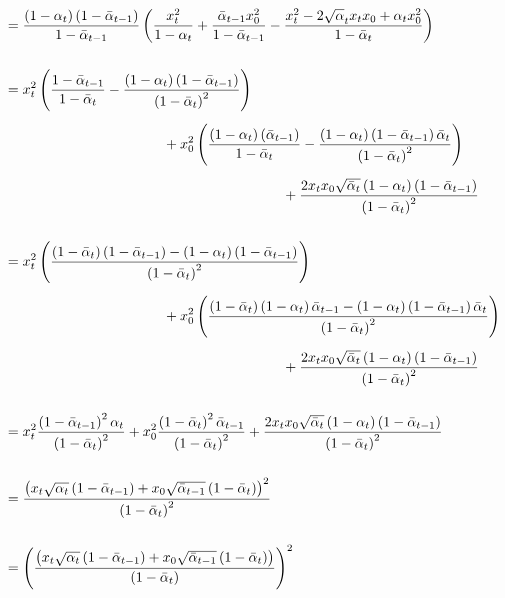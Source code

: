 \documentclass{article}
\begin{document}
\begin{align}
    &= \frac{\left(1 - \alpha_t\right)\left(1 - \bar{\alpha}_{t-1}\right)}{1 - \bar{\alpha}_{t-1}} \left( \frac{x_t^2}{1 - \alpha_t} + \frac{\bar{\alpha}_{t-1} x_0^2}{1 - \bar{\alpha}_{t-1}} - \frac{x_t^2 - 2 \sqrt{\alpha}_t x_t x_0 + \alpha_t x_0^2}{1 - \bar{\alpha}_{t}} \right) \\[15pt]
    &= x_t^2 \left(\frac{1 - \bar{\alpha}_{t-1}}{1 - \bar{\alpha}_t} - \frac{\left(1 - \alpha_t\right) \left(1 - \bar{\alpha}_{t-1}\right)}{\left(1 - \bar{\alpha}_t\right)^2}\right) \\[5pt]
    & \hspace{4cm}+ x_0^2 \left( \frac{\left(1 - \alpha_t\right)\left(\bar{\alpha}_{t-1}\right)}{1 - \bar{\alpha}_t} - \frac{\left(1 - \alpha_t\right)\left(1 - \bar{\alpha}_{t-1}\right)\bar{\alpha}_t}{\left(1 - \bar{\alpha}_t\right)^2} \right) \notag \\[5pt]
    & \hspace{7cm} + \frac{2 x_t x_0 \sqrt{\bar{\alpha}_t}\left(1 - \alpha_t\right)\left(1 - \bar{\alpha}_{t-1}\right)}{\left(1 - \bar{\alpha}_{t}\right)^2} \notag \\[15pt]
    &= x_t^2 \left(\frac{ \left( 1 - \bar{\alpha}_t \right) \left( 1 - \bar{\alpha}_{t-1} \right) - \left(1 - \alpha_t\right) \left(1 - \bar{\alpha}_{t-1}\right)}{\left(1 - \bar{\alpha}_t\right)^2}\right) \\[5pt]
    & \hspace{4cm} + x_0^2 \left( \frac{ \left( 1 - \bar{\alpha}_t \right) \left( 1 - \alpha_t \right) \bar{\alpha}_{t-1} - \left(1 - \alpha_t\right)\left(1 - \bar{\alpha}_{t-1}\right)\bar{\alpha}_t}{\left(1 - \bar{\alpha}_t\right)^2} \right) \notag \\[5pt]
    & \hspace{7cm} + \frac{2 x_t x_0 \sqrt{\bar{\alpha}_t}\left(1 - \alpha_t\right)\left(1 - \bar{\alpha}_{t-1}\right)}{\left(1 - \bar{\alpha}_{t}\right)^2} \notag \\[15pt]
    &= x_t^2 \frac{ \left( 1 - \bar{\alpha}_{t-1} \right)^2 \alpha_t }{\left(1 - \bar{\alpha}_t\right)^2} + x_0^2 \frac{\left( 1 - \bar{\alpha}_{t} \right)^2 \bar{\alpha}_{t-1}}{\left(1 - \bar{\alpha}_t\right)^2} + \frac{2 x_t x_0 \sqrt{\bar{\alpha}_t}\left(1 - \alpha_t\right)\left(1 - \bar{\alpha}_{t-1}\right)}{\left(1 - \bar{\alpha}_{t}\right)^2} \\[15pt]
    &= \frac{\left( x_t \sqrt{\alpha_t} \left( 1 - \bar{\alpha}_{t-1} \right) + x_0 \sqrt{\bar{\alpha}_{t-1}} \left( 1 - \bar{\alpha}_t \right) \right)^2}{\left(1 - \bar{\alpha}_{t}\right)^2} \\[15pt]
    &= \left(\frac{\left( x_t \sqrt{\alpha_t} \left( 1 - \bar{\alpha}_{t-1} \right) + x_0 \sqrt{\bar{\alpha}_{t-1}} \left( 1 - \bar{\alpha}_t \right) \right)}{\left(1 - \bar{\alpha}_{t}\right)} \right)^2
\end{align}
\end{document}
